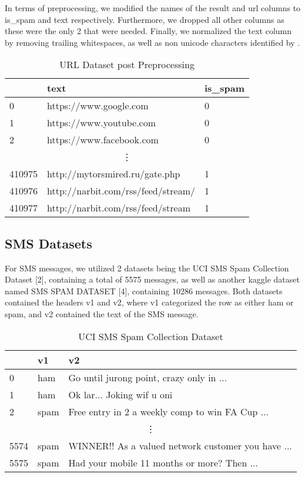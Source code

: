 \documentclass{article}
\begin{document}
\noindent
In terms of preprocessing, we modified the names of the result and url columns to is\_spam and text respectively. Furthermore, we dropped all other columns as these were the only 2 that were needed. Finally, we normalized the text column by removing trailing whitespaces, as well as non unicode characters identified by \textquestiondown .

\begin{table}[htbp]
    \centering
    \caption{URL Dataset post Preprocessing}
    \begin{tabular}{lll}
    \toprule
     & text & is\_spam \\
    \midrule
    0 & https://www.google.com & 0 \\
    1 & https://www.youtube.com & 0 \\
    2 & https://www.facebook.com & 0 \\
    \multicolumn{3}{c}{\vdots} \\ %
    410975 & http://mytorsmired.ru/gate.php & 1 \\
    410976 & http://narbit.com/rss/feed/stream/ & 1 \\
    410977 & http://narbit.com/rss/feed/stream & 1 \\
    \bottomrule
    \end{tabular}
    \label{tab:csv_sample}
\end{table}

\subsection*{SMS Datasets}
For SMS messages, we utilized 2 datasets being the UCI SMS Spam Collection Dataset [2], containing a total of 5575 messages, as well as another kaggle dataset named SMS SPAM DATASET [4], containing 10286 messages. Both datasets contained the headers v1 and v2, where v1 categorized the row as either ham or spam, and v2 contained the text of the SMS message.

\begin{table}[htbp]
    \centering
    \caption{UCI SMS Spam Collection Dataset}
    \begin{tabular}{lll}
    \toprule
     & v1 & v2 \\
    \midrule
    0 & ham & Go until jurong point, crazy only in ... \\
    1 & ham & Ok lar... Joking wif u oni \\
    2 & spam & Free entry in 2 a weekly comp to win FA Cup ... \\
    \multicolumn{3}{c}{\vdots} \\ %
    5574 & spam & WINNER!! As a valued network customer you have ... \\
    5575 & spam & Had your mobile 11 months or more? Then ... \\
    \bottomrule
    \end{tabular}
    \label{tab:csv_sample}
\end{table}
\end{document}
